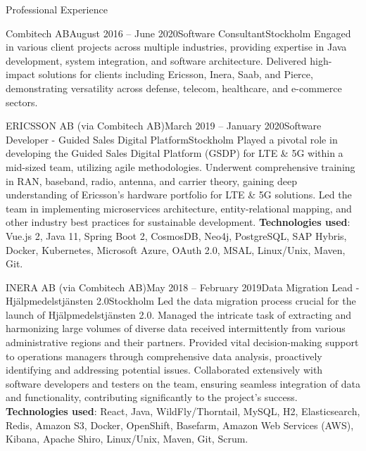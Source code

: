 \documentclass{resume}
\begin{document}
\begin{rSection}{Professional Experience}
\begin{rSubsection}{Combitech AB}{August 2016 -- June 2020}{Software Consultant}{Stockholm}
\bItem Engaged in various client projects across multiple industries, providing expertise in Java development, system integration, and software architecture.
\bItem Delivered high-impact solutions for clients including Ericsson, Inera, Saab, and Pierce, demonstrating versatility across defense, telecom, healthcare, and e-commerce sectors.
\end{rSubsection}

\begin{rClientSubsection}{ERICSSON AB (via Combitech AB)}{March 2019 -- January 2020}{Software Developer - Guided Sales Digital Platform}{Stockholm}
\bItem Played a pivotal role in developing the Guided Sales Digital Platform (GSDP) for LTE \& 5G within a mid-sized team, utilizing agile methodologies.
\bItem Underwent comprehensive training in RAN, baseband, radio, antenna, and carrier theory, gaining deep understanding of Ericsson's hardware portfolio for LTE \& 5G solutions.
\bItem Led the team in implementing microservices architecture, entity-relational mapping, and other industry best practices for sustainable development.
\bItem \textbf{Technologies used}: Vue.js 2, Java 11, Spring Boot 2, CosmosDB, Neo4j, PostgreSQL, SAP Hybris, Docker, Kubernetes, Microsoft Azure, OAuth 2.0, MSAL, Linux/Unix, Maven, Git.
\end{rClientSubsection}

\begin{rClientSubsection}{INERA AB (via Combitech AB)}{May 2018 -- February 2019}{Data Migration Lead - Hjälpmedelstjänsten 2.0}{Stockholm}
\bItem Led the data migration process crucial for the launch of Hjälpmedelstjänsten 2.0.
\bItem Managed the intricate task of extracting and harmonizing large volumes of diverse data received intermittently from various administrative regions and their partners.
\bItem Provided vital decision-making support to operations managers through comprehensive data analysis, proactively identifying and addressing potential issues.
\bItem Collaborated extensively with software developers and testers on the team, ensuring seamless integration of data and functionality, contributing significantly to the project's success.
\bItem \textbf{Technologies used}: React, Java, WildFly/Thorntail, MySQL, H2, Elasticsearch, Redis, Amazon S3, Docker, OpenShift, Basefarm, Amazon Web Services (AWS), Kibana, Apache Shiro, Linux/Unix, Maven, Git, Scrum.
\end{rClientSubsection}


\end{rSection}
\end{document}
